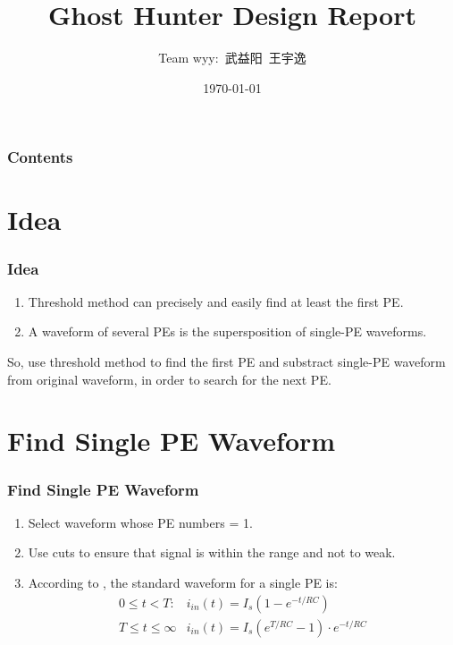 \documentclass{beamer}
\title{Ghost Hunter Design Report}
\author{Team wyy:\ 武益阳\ 王宇逸}
\date{\today}
\begin{document}
\begin{frame}
    \titlepage
\end{frame}

\begin{frame}
    \frametitle{Contents}
    \tableofcontents
\end{frame}

\section{Idea}
\begin{frame}
    \frametitle{Idea}
    \large
    \begin{enumerate}
        \item Threshold method can precisely and easily find at least the first PE. \pause
        \item A waveform of several PEs is the supersposition of single-PE waveforms. \pause
    \end{enumerate}
    
    So, use threshold method to find the first PE and substract single-PE waveform from original waveform, in order to search for the next PE.
\end{frame}

\section{Find Single PE Waveform}
\begin{frame}
    \frametitle{Find Single PE Waveform}
    \large
    \begin{enumerate}
        \item Select waveform whose PE numbers = 1. \pause
        \item Use cuts to ensure that signal is within the range and not to weak. \pause
        \item According to \cite{spieler2002pulse}, the standard waveform for a single PE is:\\
        \begin{equation*}
        \begin{array}{ll}{0 \leq t<T :} & {i_{i n}(t)=I_{s}\left(1-e^{-t / R C}\right)} \\ {T \leq t \leq \infty} & {i_{i n}(t)=I_{s}\left(e^{T / R C}-1\right) \cdot e^{-t / R C}}\end{array}
        \end{equation*}
    \end{enumerate}
\end{frame}
\end{document}
